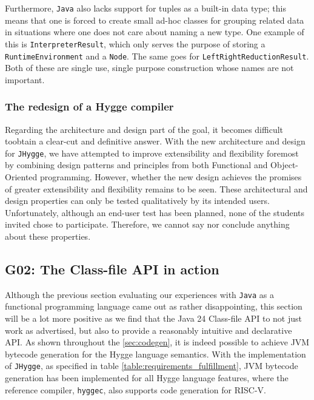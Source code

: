 Furthermore, \texttt{Java} also lacks support for tuples as a built-in data type; this means that one is forced to create small ad-hoc
classes for grouping related data in situations where one does not care about naming a new type. One example of this is \texttt{InterpreterResult},
which only serves the purpose of storing a \texttt{RuntimeEnvironment} and a \texttt{Node}. The same goes for \texttt{LeftRightReductionResult}.
Both of these are single use, single purpose construction whose names are not important.

\subsubsection{The redesign of a Hygge compiler}

Regarding the architecture and design part of the goal, it becomes difficult toobtain a clear-cut and definitive answer.
With the new architecture and design for \texttt{JHygge}, we have attempted to improve extensibility and flexibility foremost by combining design patterns
and principles from both Functional and Object-Oriented programming. However, whether the new design achieves the promises of greater extensibility
and flexibility remains to be seen. These architectural and design properties can only be tested qualitatively by its intended users. Unfortunately, although
an end-user test has been planned, none of the students invited chose to participate. Therefore, we cannot say nor conclude anything about these properties.

\subsection{\textbf{G02}: The Class-file API in action}

Although the previous section evaluating our experiences with \texttt{Java} as a functional programming language came out as rather disappointing,
this section will be a lot more positive as we find that the Java 24 Class-file API to not just work as advertised, but also to provide a
reasonably intuitive and declarative API. As shown throughout the \ref{sec:codegen},
it is indeed possible to achieve JVM bytecode generation for the Hygge language semantics. With the implementation of \texttt{JHygge},
as specified in table \ref{table:requirements_fulfillment}, JVM bytecode generation has been implemented for all Hygge language features, where the reference compiler, \texttt{hyggec},
also supports code generation for RISC-V.

